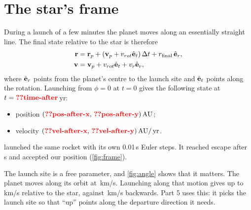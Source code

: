 \documentclass[aps,prd,twocolumn,nofootinbib,floatfix,superscriptaddress]{revtex4-2}
\begin{document}

\section{The star's frame}\label{sec:frame}
During a launch of a few minutes the planet moves along an essentially straight line.
The final state relative to the star is therefore
\begin{align}
  \mathbf{r} &= \mathbf{r}_p + (\mathbf{v}_p + v_{rot}\hat{\mathbf{e}}_t)\,\Delta t + r_{\rm final}\,\hat{\mathbf{e}}_r,\\
  \mathbf{v} &= \mathbf{v}_p + v_{rot}\hat{\mathbf{e}}_t + v_r\hat{\mathbf{e}}_r,
\end{align}
where $\hat{\mathbf{e}}_r$ points from the planet's centre to the launch site and $\hat{\mathbf{e}}_t$ points along the rotation.
Launching from $\phi=0$ at $t=0$ gives the following state at $t=\val{time-after}\,$yr:
\begin{itemize}
\item position $(\val{pos-after-x},\,\val{pos-after-y})\AU$;
\item velocity $(\val{vel-after-x},\,\val{vel-after-y})\AU/\yr$.
\end{itemize}
 launched the same rocket with its own 0.01\,s Euler steps.
It reached escape after \,s and accepted our position (\cref{fig:frame}).

The launch site is a free parameter, and \cref{fig:angle} shows that it matters.
The planet moves along its orbit at \,km/s.
Launching along that motion gives up to \,km/s relative to the star, against \,km/s backwards.
Part 5 uses this: it picks the launch site so that ``up'' points along the departure direction it needs.
\end{document}
